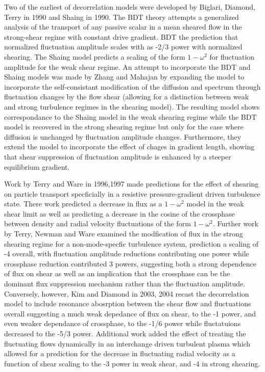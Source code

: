 \documentclass[aip,pop,amsmath,amssymb,reprint,superscriptaddress]{revtex4-1} %
\begin{document}
Two of the earliest of decorrelation models were developed by Biglari, Diamond, Terry in 1990 and Shaing in 1990. The BDT theory attempts a generalized analysis of the transport of any passive scalar in a mean sheared flow in the strong-shear regime with constant drive gradient. BDT the prediction that normalized fluctuation amplitude scales with as -2/3 power with normalized shearing. The Shaing model predicts a scaling of the form $1 - \omega^2$ for fluctuation amplitude for the weak shear regime. An attempt to incorporate the BDT and Shaing models was made by Zhang and Mahajan by expanding the model to incorporate the self-consistant modification of the diffusion and spectrum through fluctuation changes by the flow shear (allowing for a distinction between weak and strong turbulence regimes in the shearing model). The resulting model shows correspondance to the Shaing model in the weak shearing regime while the BDT model is recovered in the strong shearing regime but only for the case where diffusion is unchanged by fluctuation amplitude changes. Furthermore, they extend the model to incorporate the effect of chages in gradient length, showing that shear suppression of fluctuation amplitude is enhanced by a steeper equilibrium gradient. 

Work by Terry and Ware in 1996,1997 made predictions for the effect of shearing on particle transport specficially in a resistive pressure-gradient driven turbulence state. There work predicted a decrease in flux as a $1-\omega^2$ model in the weak shear limit as well as predicting a decrease in the cosine of the crossphase between density and radial velocity fluctuations of the form $1-\omega^2$. Further work by Terry, Newman and Ware examined the modfication of flux in the strong shearing regime for a non-mode-specfic turbulence system, prediction a scaling of -4 overall, with fluctuation amplitude reductions contributing one power while crossphase reduction contributed 3 powers, suggesting both a strong dependence of flux on shear as well as an implication that the crossphase can be the dominant flux suppression mechanism rather than the fluctuation amplitude. Conversely, however, Kim and Diamond in 2003, 2004 recast the decorrelation model to include resonance abosrption between the shear flow and fluctuations overall suggesting a much weak depedance of flux on shear, to the -1 power, and even weaker dependance of crossphase, to the -1/6 power while fluctatuions decreased to the -5/3 power. Additional work added the effect of treating the fluctuating flows dynamically in an interchange driven turbulent plasma which allowed for a prediction for the decrease in fluctuating radial velocity as a function of shear scaling to the -3 power in weak shear, and -4 in strong shearing.
\end{document}
